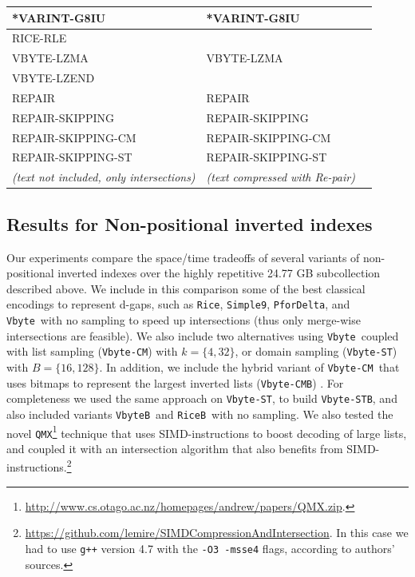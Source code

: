 \documentclass[review]{elsarticle}
\newcommand{\vbyte}{\texttt{Vbyte}}
\newcommand{\vbyteB}{\texttt{VbyteB}}
\newcommand{\rice}{\texttt{Rice}}
\newcommand{\riceB}{\texttt{RiceB}}
\newcommand{\simplen}{\texttt{Simple9}}
\newcommand{\pfordelta}{\texttt{PforDelta}}
\newcommand{\qmx}{\texttt{QMX}}
\newcommand{\vbyteCM}{\texttt{Vbyte-CM}}
\newcommand{\vbyteCMB}{\texttt{Vbyte-CMB}}
\newcommand{\vbyteST}{\texttt{Vbyte-ST}}
\newcommand{\vbyteSTB}{\texttt{Vbyte-STB}}
\begin{document}
\begin{table}[htbp]
\begin{center}
\begin{tabular}{|l|l|l|}
	*VARINT-G8IU              &  *VARINT-G8IU            &             \\ \hline
	RICE-RLE                  &                          &             \\ \hline
	VBYTE-LZMA                &  VBYTE-LZMA              &             \\ \hline
	VBYTE-LZEND               &                          &             \\ \hline
	REPAIR                    &  REPAIR                  &             \\ \hline
	REPAIR-SKIPPING           &  REPAIR-SKIPPING         &             \\ \hline
	REPAIR-SKIPPING-CM        &  REPAIR-SKIPPING-CM      &             \\ \hline
	REPAIR-SKIPPING-ST        &  REPAIR-SKIPPING-ST      &             \\ \hline
	\hline
	\textit{(text not included, only intersections)} & \textit{(text compressed with Re-pair)} &  \\ 
		\hline
	\end{tabular}
	\label{tab:techniques}
	\end{center}
\end{table}





\subsection{Results for Non-positional inverted indexes}

Our experiments compare the space/time tradeoffs of several variants of 
non-positional inverted indexes over the highly repetitive 24.77 GB subcollection described above. We include in this comparison some of the best classical encodings to represent d-gaps, such as \rice, \simplen, 
\pfordelta, and \vbyte\ with no sampling to speed up intersections (thus only merge-wise intersections are feasible). 
We also include two alternatives using \vbyte\ coupled with list sampling \cite{CM10} (\vbyteCM) with $k=\{4,32\}$, or domain sampling \cite{TS10} (\vbyteST) with $B=\{16,128\}$. In addition, we include the hybrid variant of \vbyteCM\ that uses bitmaps to represent the largest inverted lists (\vbyteCMB) \cite{CM10}. For completeness we used the same approach on \vbyteST, to build \vbyteSTB, and also included variants \vbyteB\ and \riceB\ with no sampling.
We also tested the novel \qmx\footnote{\url{http://www.cs.otago.ac.nz/homepages/andrew/papers/QMX.zip}. } technique \cite{trotman2014} that uses SIMD-instructions to boost decoding of large lists, and coupled it with an intersection algorithm \cite{Lemire2015:simdInt} that also benefits from SIMD-instructions.\footnote{ \url{https://github.com/lemire/SIMDCompressionAndIntersection}. In this case we had to use \texttt{g++} version 4.7 with the \texttt{-O3 -msse4} flags, according to authors' sources.}
\end{document}
